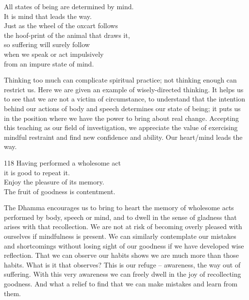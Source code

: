 
\begin{dhpVerse}{1}
\label{dhp-1}
All states of being are determined by mind.\\
It is mind that leads the way.\\
Just as the wheel of the oxcart follows\\
the hoof-print of the animal that draws it,\\
so suffering will surely follow\\
when we speak or act impulsively\\
from an impure state of mind.
\end{dhpVerse}

\begin{dhpRefl}

Thinking too much can complicate spiritual practice; not thinking
enough can restrict us. Here we are given an example of
wisely-directed thinking. It helps us to see that we are not a victim
of circumstance, to understand that the intention behind our
actions of body and speech determines our state of being; it puts
us in the position where we have the power to bring about real
change. Accepting this teaching as our field of investigation, we
appreciate the value of exercising mindful restraint and find new
confidence and ability. Our heart/mind leads the way.

\end{dhpRefl}


\begin{dhpVerse}{118}
\label{dhp-118}
Having performed a wholesome act\\
it is good to repeat it.\\
Enjoy the pleasure of its memory.\\
The fruit of goodness is contentment.
\end{dhpVerse}

\begin{dhpRefl}

The Dhamma encourages us to bring to heart the memory of wholesome
acts performed by body, speech or mind, and to dwell in the sense of
gladness that arises with that recollection. We are not at risk of
becoming overly pleased with ourselves if mindfulness is present. We
can similarly contemplate our mistakes and shortcomings without
losing sight of our goodness if we have developed wise reflection.
That we can observe our habits shows we are much more than those
habits. What is it that observes? This is our refuge -- awareness,
the way out of suffering. With this very awareness we can freely
dwell in the joy of recollecting goodness. And what a relief to find
that we can make mistakes and learn from them.

\end{dhpRefl}

